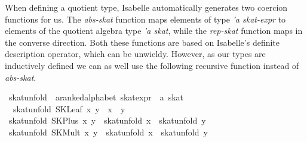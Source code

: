\documentclass{llncs}
\begin{document}
When defining a quotient type, Isabelle automatically generates two
coercion functions for us. The \textit{abs-skat} function maps
elements of type \textit{'a skat-expr} to elements of the quotient
algebra type \textit{'a skat}, while the \textit{rep-skat} function
maps in the converse direction. Both these functions are based on
Isabelle's definite description operator, which can be
unwieldy. However, as our types are inductively defined we can as well
use the following recursive function instead of \textit{abs-skat}.

\begin{isabellebody}
\isanewline
{}\isamarkupfalse%
\ skat{}unfold\ {}{}\ {}{}a{}{}ranked{}alphabet\ skat{}expr\ {}\ {}a\ skat{}\ {}{}{}{}{}{}\ {}{}{}{}{}\ {}{}{}{}\ \isanewline
\ \ {}skat{}unfold\ {}SKLeaf\ x\ y{}\ {}\ x\ {}{}\ y{}\isanewline
{}\ {}skat{}unfold\ {}SKPlus\ x\ y{}\ {}\ skat{}unfold\ x\ {}\ skat{}unfold\ y{}\isanewline
{}\ {}skat{}unfold\ {}SKMult\ x\ y{}\ {}\ skat{}unfold\ x\ {}\ skat{}unfold\ y{}\isanewline

\end{isabellebody}
\end{document}

